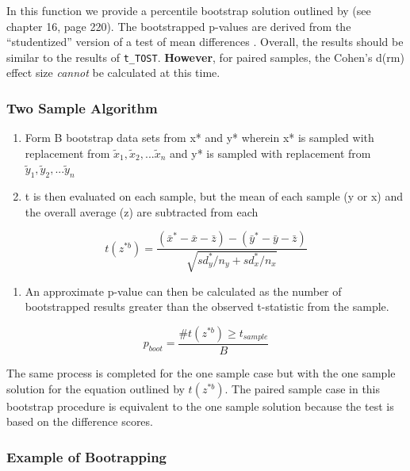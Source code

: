 \documentclass[]{interact}
\theoremstyle{plain}%
\theoremstyle{definition}
\theoremstyle{remark}
\providecommand{\tightlist}{%
  \setlength{\itemsep}{0pt}\setlength{\parskip}{0pt}}
\def\tightlist{}
\begin{document}
In this function we provide a percentile bootstrap solution outlined by
\citet{efron93} (see chapter 16, page 220). The bootstrapped p-values
are derived from the ``studentized'' version of a test of mean
differences \citep{efron93}. Overall, the results should be similar to
the results of \texttt{t\_TOST}. \textbf{However}, for paired samples,
the Cohen's d(rm) effect size \emph{cannot} be calculated at this time.

\hypertarget{two-sample-algorithm}{%
\subsubsection{Two Sample Algorithm}\label{two-sample-algorithm}}

\begin{enumerate}
\def\labelenumi{\arabic{enumi}.}
\item
  Form B bootstrap data sets from x* and y* wherein x* is sampled with
  replacement from \(\tilde x_1,\tilde x_2, ... \tilde x_n\) and y* is
  sampled with replacement from
  \(\tilde y_1,\tilde y_2, ... \tilde y_n\)
\item
  t is then evaluated on each sample, but the mean of each sample (y or
  x) and the overall average (z) are subtracted from each
\end{enumerate}

\[
t(z^{*b}) = \frac {(\bar x^*-\bar x - \bar z) - (\bar y^*-\bar y - \bar z)}{\sqrt {sd_y^*/n_y + sd_x^*/n_x}}
\]

\begin{enumerate}
\def\labelenumi{\arabic{enumi}.}
\setcounter{enumi}{2}
\tightlist
\item
  An approximate p-value can then be calculated as the number of
  bootstrapped results greater than the observed t-statistic from the
  sample.
\end{enumerate}

\[
p_{boot} = \frac {\#t(z^{*b}) \ge t_{sample}}{B}
\]

The same process is completed for the one sample case but with the one
sample solution for the equation outlined by \(t(z^{*b})\). The paired
sample case in this bootstrap procedure is equivalent to the one sample
solution because the test is based on the difference scores.

\hypertarget{example-of-bootrapping}{%
\subsubsection{Example of Bootrapping}\label{example-of-bootrapping}}
\end{document}
